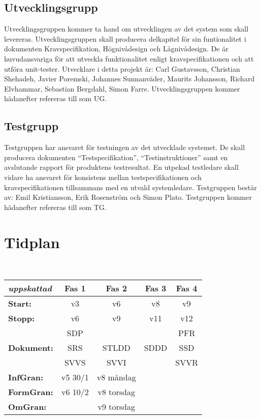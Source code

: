 \documentclass[paper=a4, fontsize=11pt,twoside]{article}
\begin{document}
\subsection*{Utvecklingsgrupp}
Utvecklingsgruppen kommer ta hand om utvecklingen av det system som skall levereras. Utvecklingsgruppen skall producera delkapitel för sin funtionalitet i dokumenten Kravspecifikation, Högnivådesign och Lågnivådesign. De är huvudansvariga för att utveckla funktionalitet enligt kravspecifikationen och att utföra unit-tester. Utvecklare i detta projekt är: Carl Gustavsson, Christian Shehadeh, Javier Poremski, Johannes Sunnanväder, Maurits Johansson, Richard Elvhammar, Sebastian Bergdahl, Simon Farre.
Utvecklingsgruppen kommer hädanefter refereras till som UG.

\subsection*{Testgrupp}
Testgruppen har ansvaret för testningen av det utvecklade systemet. De skall producera dokumenten ``Testspecifikation'', ``Testinstruktioner'' samt en avslutande rapport för produktens testresultat. En utpekad testledare skall vidare ha ansvaret för konsistens mellan testspecifikationen och kravspecifikationen tillsammans med en utvald systemledare. Testgruppen består av: Emil Kristiansson, Erik Rosenström och Simon Plato.
Testgruppen kommer hädanefter refereras till som TG.

\section{Tidplan}

{\color{red}{Jag har förslag på ett mall för en kalender vi kan sätta in för specifikt planering och vi kan hålla tabellerna till översiktsnivå, men vi kan diskutera det när vi har detaljerna}}\\
\begin{tabular}{| l | c | c | c | c |}
\hline
\textit{uppskattad} & \textbf{Fas 1} & \textbf{Fas 2} & \textbf{Fas 3} & \textbf{Fas 4}\\
\hline
\hline
\textbf{Start:} & v3 & v6 & v8 & v9 \\
\hline
\textbf{Stopp:} & v6 & v9 & v11 & v12 \\
\hline
 				& SDP & & & PFR \\
\textbf{Dokument:} & SRS & STLDD & SDDD & SSD \\
 				& SVVS & SVVI & & SVVR \\
\hline
\textbf{InfGran:} & v5 30/1 & v8 måndag & & \\
\hline
\textbf{FormGran:} & v6 10/2 & v8 torsdag & & \\
\hline
\textbf{OmGran:} & & v9 torsdag & & \\
\hline
\end{tabular}
\end{document}
